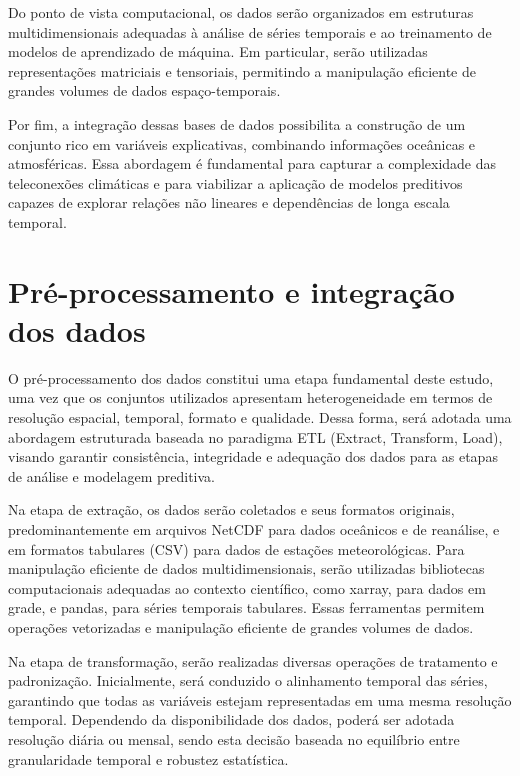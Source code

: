 	Do ponto de vista computacional, os dados serão organizados em estruturas multidimensionais adequadas à análise de séries temporais e ao treinamento de modelos de aprendizado de máquina.
	Em particular, serão utilizadas representações matriciais e tensoriais, permitindo a manipulação eficiente de grandes volumes de dados espaço-temporais.

	Por fim, a integração dessas bases de dados possibilita a construção de um conjunto rico em variáveis explicativas, combinando informações oceânicas e atmosféricas.
	Essa abordagem é fundamental para capturar a complexidade das teleconexões climáticas e para viabilizar a aplicação de modelos preditivos capazes de explorar relações não lineares e dependências de longa escala temporal.


\section{Pré-processamento e integração dos dados}\label{sec:pre-processamento}

	O pré-processamento dos dados constitui uma etapa fundamental deste estudo, uma vez que os conjuntos utilizados apresentam heterogeneidade em termos de resolução espacial, temporal, formato e qualidade.
	Dessa forma, será adotada uma abordagem estruturada baseada no paradigma ETL (Extract, Transform, Load), visando garantir consistência, integridade e adequação dos dados para as etapas de análise e modelagem preditiva.

	Na etapa de extração, os dados serão coletados e seus formatos originais, predominantemente em arquivos NetCDF para dados oceânicos e de reanálise, e em formatos tabulares (CSV) para dados de estações meteorológicas.
	Para manipulação eficiente de dados multidimensionais, serão utilizadas bibliotecas computacionais adequadas ao contexto científico, como xarray, para dados em grade, e pandas, para séries temporais tabulares. 
	Essas ferramentas permitem operações vetorizadas e manipulação eficiente de grandes volumes de dados.

	Na etapa de transformação, serão realizadas diversas operações de tratamento e padronização.
	Inicialmente, será conduzido o alinhamento temporal das séries, garantindo que todas as variáveis estejam representadas em uma mesma resolução temporal.
	Dependendo da disponibilidade dos dados, poderá ser adotada resolução diária ou mensal, sendo esta decisão baseada no equilíbrio entre granularidade temporal e robustez estatística.

